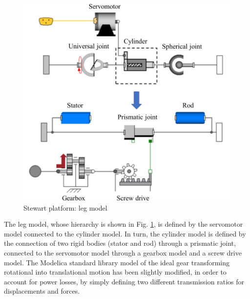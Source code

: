 \documentclass[]{interact}
\theoremstyle{plain}%
\theoremstyle{definition}
\theoremstyle{remark}
\begin{document}
{\begin{figure}
\centering
\includegraphics[width=0.65\columnwidth]{./images/Stewart_platform_Modelica_leg.pdf}
\caption{Stewart platform: leg model} \label{Fig:Stewart_platform_Modelica_leg}
\end{figure}
The leg model, whose hierarchy is shown in Fig. \ref{Fig:Stewart_platform_Modelica_leg}, is defined by the servomotor model connected to the cylinder model. In turn, the cylinder model is defined by the connection of two rigid bodies (stator and rod) through a prismatic joint, connected to the servomotor model through a gearbox model and a screw drive model. The Modelica standard library model of the ideal gear transforming rotational into translational motion has been slightly modified, in order to account for power losses, by simply defining two different transmission ratios for displacements and forces.

}
\end{document}
